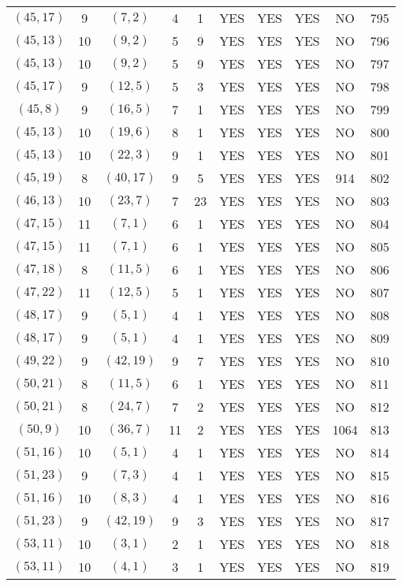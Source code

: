\begin{longtable}{|c|c|c|c|c|c|c|c|c|c|}
$(45, 17)$ & 9 & $(7, 2)$ & 4 & 1 & YES & YES & YES & NO & 795\\
$(45, 13)$ & 10 & $(9, 2)$ & 5 & 9 & YES & YES & YES & NO & 796\\
$(45, 13)$ & 10 & $(9, 2)$ & 5 & 9 & YES & YES & YES & NO & 797\\
$(45, 17)$ & 9 & $(12, 5)$ & 5 & 3 & YES & YES & YES & NO & 798\\
$(45, 8)$ & 9 & $(16, 5)$ & 7 & 1 & YES & YES & YES & NO & 799\\
$(45, 13)$ & 10 & $(19, 6)$ & 8 & 1 & YES & YES & YES & NO & 800\\
$(45, 13)$ & 10 & $(22, 3)$ & 9 & 1 & YES & YES & YES & NO & 801\\
$(45, 19)$ & 8 & $(40, 17)$ & 9 & 5 & YES & YES & YES & 914 & 802\\
$(46, 13)$ & 10 & $(23, 7)$ & 7 & 23 & YES & YES & YES & NO & 803\\
$(47, 15)$ & 11 & $(7, 1)$ & 6 & 1 & YES & YES & YES & NO & 804\\
$(47, 15)$ & 11 & $(7, 1)$ & 6 & 1 & YES & YES & YES & NO & 805\\
$(47, 18)$ & 8 & $(11, 5)$ & 6 & 1 & YES & YES & YES & NO & 806\\
$(47, 22)$ & 11 & $(12, 5)$ & 5 & 1 & YES & YES & YES & NO & 807\\
$(48, 17)$ & 9 & $(5, 1)$ & 4 & 1 & YES & YES & YES & NO & 808\\
$(48, 17)$ & 9 & $(5, 1)$ & 4 & 1 & YES & YES & YES & NO & 809\\
$(49, 22)$ & 9 & $(42, 19)$ & 9 & 7 & YES & YES & YES & NO & 810\\
$(50, 21)$ & 8 & $(11, 5)$ & 6 & 1 & YES & YES & YES & NO & 811\\
$(50, 21)$ & 8 & $(24, 7)$ & 7 & 2 & YES & YES & YES & NO & 812\\
$(50, 9)$ & 10 & $(36, 7)$ & 11 & 2 & YES & YES & YES & 1064 & 813\\
$(51, 16)$ & 10 & $(5, 1)$ & 4 & 1 & YES & YES & YES & NO & 814\\
$(51, 23)$ & 9 & $(7, 3)$ & 4 & 1 & YES & YES & YES & NO & 815\\
$(51, 16)$ & 10 & $(8, 3)$ & 4 & 1 & YES & YES & YES & NO & 816\\
$(51, 23)$ & 9 & $(42, 19)$ & 9 & 3 & YES & YES & YES & NO & 817\\
$(53, 11)$ & 10 & $(3, 1)$ & 2 & 1 & YES & YES & YES & NO & 818\\
$(53, 11)$ & 10 & $(4, 1)$ & 3 & 1 & YES & YES & YES & NO & 819\\

\end{longtable}
